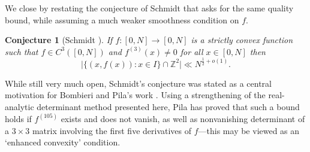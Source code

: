 \documentclass[12pt]{amsart}
\newcommand{\1}{{\mathbf 1}}
\newtheorem{conjecture}[theorem]{Conjecture}
\theoremstyle{remark}
\theoremstyle{definition}
\begin{document}
We close by restating the conjecture of Schmidt that asks for the same quality bound, while assuming a much weaker smoothness condition on $f$.
\begin{conjecture}[Schmidt \cite{Sc85}]
If $f:[0,N]\to [0,N]$ is a strictly convex function such that $f\in C^3([0,N])$ and $f^{(3)}(x)\neq 0$ for all $x\in [0,N]$ then
\[ \lvert \{ (x,f(x)) : x \in I\}\cap \mathbb{Z}^2 \rvert \ll N^{\frac{1}{2}+o(1)}.\]
\end{conjecture}
While still very much open, Schmidt's conjecture was stated as a central motivation for Bombieri and Pila's work \cite{BP89}. Using a strengthening of the real-analytic determinant method presented here,
Pila \cite{Pi91} has proved %
that such a bound holds if $f^{(105)}$ exists and does not vanish, as well as nonvanishing determinant of a $3\times 3$ matrix involving the first five derivatives of $f$---this may be viewed as an `enhanced convexity' condition. 
\end{document}
